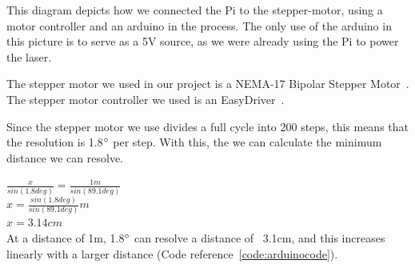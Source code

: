 This diagram depicts how we connected the Pi to the stepper-motor, using a motor controller and an arduino in the process.
The only use of the arduino in this picture is to serve as a 5V source, as we were already using the Pi to power the laser.

The stepper motor we used in our project is a NEMA-17 Bipolar Stepper Motor~\cite{steppermotor}.
The stepper motor controller we used is an EasyDriver~\cite{steppercontroller}.



Since the stepper motor we use divides a full cycle into 200 steps, this means that the resolution is 1.8$\degree$ per step. With this, the we can calculate the minimum distance we can resolve.

$\frac{x}{sin(1.8deg)} = \frac{1m}{sin(89.1deg)}$ \\
$x = \frac{sin(1.8deg)}{sin(89.1deg)}m$ \\
$x = 3.14cm$ \\

At a distance of 1m, 1.8$\degree$ can resolve a distance of ~3.1cm, and this increases linearly with a larger distance (Code reference~\ref{code:arduinocode}).
